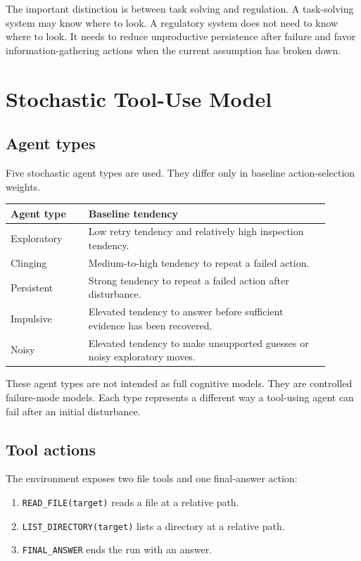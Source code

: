 \documentclass[11pt]{article}
\begin{document}
The important distinction is between task solving and regulation. A task-solving system may know where to look. A regulatory system does not need to know where to look. It needs to reduce unproductive persistence after failure and favor information-gathering actions when the current assumption has broken down.

\section{Stochastic Tool-Use Model}

\subsection{Agent types}

Five stochastic agent types are used. They differ only in baseline action-selection weights.

\begin{center}
\begin{tabular}{p{0.22\linewidth} p{0.68\linewidth}}
\toprule
\textbf{Agent type} & \textbf{Baseline tendency} \\
\midrule
Exploratory & Low retry tendency and relatively high inspection tendency. \\
Clinging & Medium-to-high tendency to repeat a failed action. \\
Persistent & Strong tendency to repeat a failed action after disturbance. \\
Impulsive & Elevated tendency to answer before sufficient evidence has been recovered. \\
Noisy & Elevated tendency to make unsupported guesses or noisy exploratory moves. \\
\bottomrule
\end{tabular}
\end{center}

These agent types are not intended as full cognitive models. They are controlled failure-mode models. Each type represents a different way a tool-using agent can fail after an initial disturbance.

\subsection{Tool actions}

The environment exposes two file tools and one final-answer action:

\begin{enumerate}[leftmargin=1.5em]
    \item \texttt{READ\_FILE(target)} reads a file at a relative path.
    \item \texttt{LIST\_DIRECTORY(target)} lists a directory at a relative path.
    \item \texttt{FINAL\_ANSWER} ends the run with an answer.
\end{enumerate}
\end{document}

